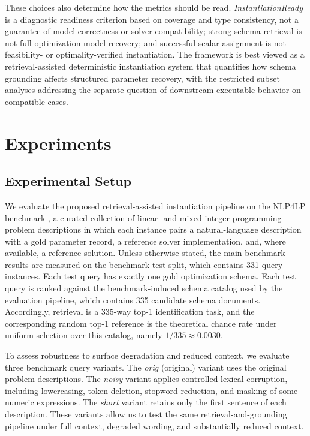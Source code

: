 \documentclass[3p]{elsarticle}
\begin{document}
These choices also determine how the metrics should be read. \textit{InstantiationReady} is a diagnostic readiness criterion based on coverage and type consistency, not a guarantee of model correctness or solver compatibility; strong schema retrieval is not full optimization-model recovery; and successful scalar assignment is not feasibility- or optimality-verified instantiation. The framework is best viewed as a retrieval-assisted deterministic instantiation system that quantifies how schema grounding affects structured parameter recovery, with the restricted subset analyses addressing the separate question of downstream executable behavior on compatible cases.

\section{Experiments}
\label{sec:experiments}

\subsection{Experimental Setup}
\label{subsec:exp_setup}

We evaluate the proposed retrieval-assisted instantiation pipeline on the \textsc{NLP4LP} benchmark \cite{nlp4lp_dataset,ahmaditeshnizi2024optimus_icml}, a curated collection of linear- and mixed-integer-programming problem descriptions in which each instance pairs a natural-language description with a gold parameter record, a reference solver implementation, and, where available, a reference solution. Unless otherwise stated, the main benchmark results are measured on the benchmark test split, which contains 331 query instances. Each test query has exactly one gold optimization schema. Each test query is ranked against the benchmark-induced schema catalog used by the evaluation pipeline, which contains 335 candidate schema documents. Accordingly, retrieval is a 335-way top-1 identification task, and the corresponding random top-1 reference is the theoretical chance rate under uniform selection over this catalog, namely $1/335 \approx 0.0030$.

To assess robustness to surface degradation and reduced context, we evaluate three benchmark query variants. The \emph{orig} (original) variant uses the original problem descriptions. The \emph{noisy} variant applies controlled lexical corruption, including lowercasing, token deletion, stopword reduction, and masking of some numeric expressions. The \emph{short} variant retains only the first sentence of each description. These variants allow us to test the same retrieval-and-grounding pipeline under full context, degraded wording, and substantially reduced context.
\end{document}
